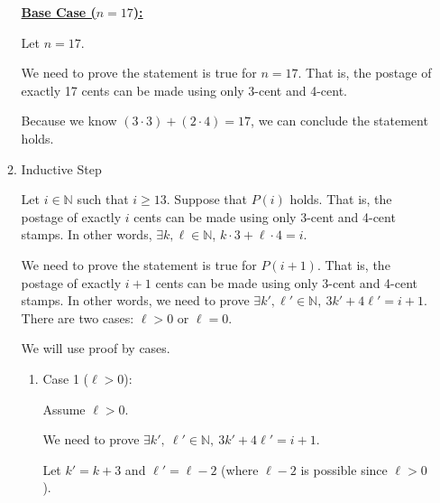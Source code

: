 \documentclass[12pt]{article}
\begin{document}
\begin{itemize}
\begin{mdframed}
\begin{enumerate}[1.]
            \begin{mdframed}
            \underline{\textbf{Base Case ($n = 17$):}}

            \bigskip

            Let $n = 17$.

            \bigskip

            We need to prove the statement is true for $n = 17$. That is, the
            postage of exactly 17 cents can be made using only 3-cent and 4-cent.

            \bigskip

            Because we know $(3 \cdot 3) + (2 \cdot 4)=17$, we can conclude the statement holds.

            \end{mdframed}

            \item Inductive Step

            \bigskip

            Let $i \in \mathbb{N}$ such that $i \geq 13$. Suppose that $P(i)$ holds. That is, the postage of
            exactly $i$ cents can be made using only 3-cent and 4-cent stamps. In other words,
            $\exists k, \ell \in \mathbb{N}$, $k \cdot 3 + \ell \cdot 4 = i$.

            \bigskip

            We need to prove the statement is true for $P(i+1)$. That is, the postage
            of exactly $i+1$ cents can be made using only 3-cent and 4-cent stamps. In other
            words, we need to prove $\exists k', \ell' \in \mathbb{N},\:
            3k' + 4\ell' = i + 1$. There are two cases: $\ell > 0$
            or $\ell = 0$.

            \bigskip

            We will use proof by cases.

            \begin{enumerate}[1.]
                \item Case 1 ($\ell > 0$):

                \bigskip

                Assume $\ell > 0$.

                \bigskip

                We need to prove $\exists k',\:\ell' \in \mathbb{N},\:3k' + 4\ell' = i + 1$.

                \bigskip

                Let $k' = k + 3$ and $\ell' = \ell - 2$ (where $\ell - 2$ is possible
                since $\ell > 0$).


\end{enumerate}
\end{enumerate}
\end{mdframed}
\end{itemize}
\end{document}
